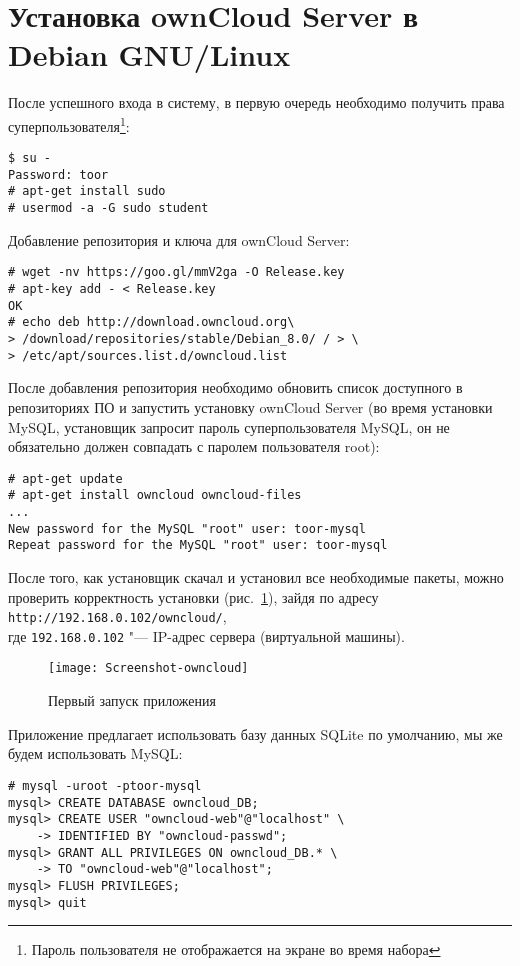 \section{Установка ownCloud Server в Debian GNU/Linux} \label{pril:c}

После успешного входа в систему, в первую очередь необходимо получить права суперпользователя\footnote{Пароль пользователя не отображается на экране во время набора}:
\begin{lstlisting}
$ su -
Password: toor
# apt-get install sudo
# usermod -a -G sudo student
\end{lstlisting}

Добавление репозитория и ключа для ownCloud Server:
\begin{lstlisting}
# wget -nv https://goo.gl/mmV2ga -O Release.key
# apt-key add - < Release.key
OK
# echo deb http://download.owncloud.org\
> /download/repositories/stable/Debian_8.0/ / > \
> /etc/apt/sources.list.d/owncloud.list
\end{lstlisting}

После добавления репозитория необходимо обновить список доступного в репозиториях ПО и запустить установку ownCloud Server (во время установки MySQL, установщик запросит пароль суперпользователя MySQL, он не обязательно должен совпадать с паролем пользователя root):
\begin{lstlisting}
# apt-get update
# apt-get install owncloud owncloud-files
...
New password for the MySQL "root" user: toor-mysql
Repeat password for the MySQL "root" user: toor-mysql
\end{lstlisting}

После того, как установщик скачал и установил все необходимые пакеты, можно проверить корректность установки (рис.~\ref{pic:first-own}), зайдя по адресу \texttt{http://192.168.0.102/owncloud/}, \\
где \texttt{192.168.0.102} "--- IP-адрес сервера (виртуальной машины).

\begin{figure}[ht]
    \centering
    \texttt{[image: Screenshot-owncloud]}
    \caption{Первый запуск приложения}\label{pic:first-own}
\end{figure}

Приложение предлагает использовать базу данных SQLite по умолчанию, мы же будем использовать MySQL:
\begin{lstlisting}
# mysql -uroot -ptoor-mysql
mysql> CREATE DATABASE owncloud_DB;
mysql> CREATE USER "owncloud-web"@"localhost" \
    -> IDENTIFIED BY "owncloud-passwd";
mysql> GRANT ALL PRIVILEGES ON owncloud_DB.* \
    -> TO "owncloud-web"@"localhost";
mysql> FLUSH PRIVILEGES;
mysql> quit
\end{lstlisting}


